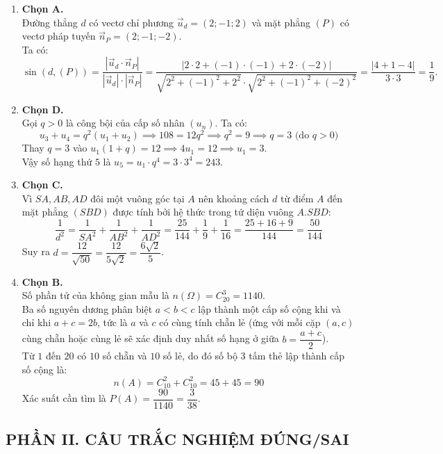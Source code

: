 \documentclass[12pt,a4paper]{article}
\begin{document}
\begin{enumerate}[label=\textbf{Câu \arabic*:}, leftmargin=*]
\item \textbf{Chọn A.}\\
Đường thẳng $d$ có vectơ chỉ phương $\vec{u}_d = (2; -1; 2)$ và mặt phẳng $(P)$ có vectơ pháp tuyến $\vec{n}_P = (2; -1; -2)$.\\
Ta có:
$$\sin(d, (P)) = \dfrac{|\vec{u}_d \cdot \vec{n}_P|}{|\vec{u}_d| \cdot |\vec{n}_P|} = \dfrac{|2\cdot 2 + (-1)\cdot(-1) + 2\cdot(-2)|}{\sqrt{2^2 + (-1)^2 + 2^2}\cdot\sqrt{2^2 + (-1)^2 + (-2)^2}} = \dfrac{|4 + 1 - 4|}{3 \cdot 3} = \dfrac{1}{9}.$$

\item \textbf{Chọn D.}\\
Gọi $q > 0$ là công bội của cấp số nhân $(u_n)$. Ta có:
$$u_3 + u_4 = q^2(u_1 + u_2) \implies 108 = 12q^2 \implies q^2 = 9 \implies q = 3 \text{ (do } q > 0\text{)}$$
Thay $q = 3$ vào $u_1(1 + q) = 12 \implies 4u_1 = 12 \implies u_1 = 3$.\\
Vậy số hạng thứ $5$ là $u_5 = u_1 \cdot q^4 = 3 \cdot 3^4 = 243$.

\item \textbf{Chọn C.}\\
Vì $SA, AB, AD$ đôi một vuông góc tại $A$ nên khoảng cách $d$ từ điểm $A$ đến mặt phẳng $(SBD)$ được tính bởi hệ thức trong tứ diện vuông $A.SBD$:
$$\dfrac{1}{d^2} = \dfrac{1}{SA^2} + \dfrac{1}{AB^2} + \dfrac{1}{AD^2} = \dfrac{25}{144} + \dfrac{1}{9} + \dfrac{1}{16} = \dfrac{25 + 16 + 9}{144} = \dfrac{50}{144}$$
Suy ra $d = \dfrac{12}{\sqrt{50}} = \dfrac{12}{5\sqrt{2}} = \dfrac{6\sqrt{2}}{5}$.

\item \textbf{Chọn B.}\\
Số phần tử của không gian mẫu là $n(\Omega) = C_{20}^{3} = 1140$.\\
Ba số nguyên dương phân biệt $a < b < c$ lập thành một cấp số cộng khi và chỉ khi $a + c = 2b$, tức là $a$ và $c$ có cùng tính chẵn lẻ (ứng với mỗi cặp $(a, c)$ cùng chẵn hoặc cùng lẻ sẽ xác định duy nhất số hạng ở giữa $b = \dfrac{a+c}{2}$).\\
Từ $1$ đến $20$ có $10$ số chẵn và $10$ số lẻ, do đó số bộ $3$ tấm thẻ lập thành cấp số cộng là:
$$n(A) = C_{10}^{2} + C_{10}^{2} = 45 + 45 = 90$$
Xác suất cần tìm là $P(A) = \dfrac{90}{1140} = \dfrac{3}{38}$.

\end{enumerate}

\subsection*{PHẦN II. CÂU TRẮC NGHIỆM ĐÚNG/SAI}
\end{document}
